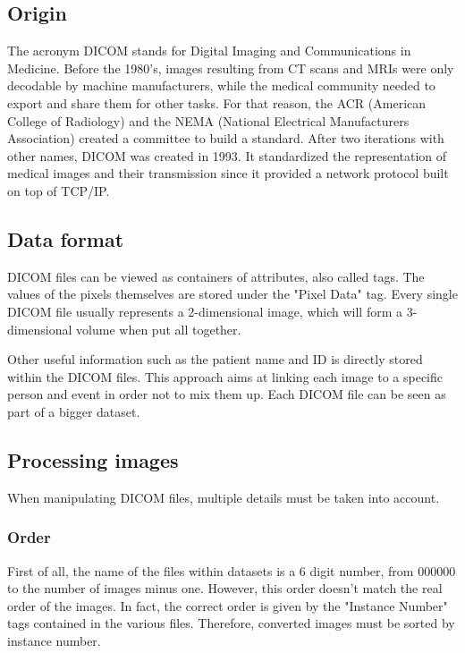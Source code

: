 \subsection{Origin}

The acronym DICOM stands for Digital Imaging and Communications in Medicine. Before the 1980’s, images resulting from CT scans and MRIs were only decodable by machine manufacturers, while the medical community needed to export and share them for other tasks. For that reason, the ACR (American College of Radiology) and the NEMA (National Electrical Manufacturers Association) created a committee to build a standard. After two iterations with other names, DICOM was created in 1993. It standardized the representation of medical images and their transmission since it provided a network protocol built on top of TCP/IP.


\subsection{Data format}

DICOM files can be viewed as containers of attributes, also called tags. The values of the pixels themselves are stored under the "Pixel Data" tag. Every single DICOM file usually represents a 2-dimensional image, which will form a 3-dimensional volume when put all together. 

Other useful information such as the patient name and ID is directly stored within the DICOM files. This approach aims at linking each image to a specific person and event in order not to mix them up. Each DICOM file can be seen as part of a bigger dataset. 


\subsection{Processing images}

When manipulating DICOM files, multiple details must be taken into account. 

\subsubsection{Order}
First of all, the name of the files within datasets is a 6 digit number, from 000000 to the number of images minus one. However, this order doesn’t match the real order of the images. In fact, the correct order is given by the "Instance Number" tags contained in the various files. Therefore, converted images must be sorted by instance number. 

